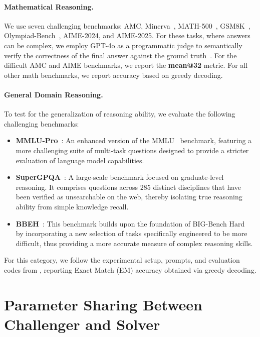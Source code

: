 \paragraph{Mathematical Reasoning.}
We use seven challenging benchmarks: AMC, Minerva~\citep{Lewkowycz2022SolvingQR}, MATH-500~\citep{Hendrycks2021MeasuringMP}, GSM8K~\citep{Cobbe2021TrainingVT}, Olympiad-Bench~\citep{He2024OlympiadBenchAC}, AIME-2024, and AIME-2025. For these tasks, where answers can be complex, we employ GPT-4o as a programmatic judge to semantically verify the correctness of the final answer against the ground truth~\citep{Zhao2025OneTT}. For the difficult AMC and AIME benchmarks, we report the \textbf{mean@32} metric. For all other math benchmarks, we report accuracy based on greedy decoding.

\paragraph{General Domain Reasoning.}
To test for the generalization of reasoning ability, we evaluate the following challenging benchmarks:
\begin{itemize}
    \item \textbf{MMLU-Pro}~\citep{Wang2024MMLUProAM}: An enhanced version of the MMLU~\citep{Hendrycks2020MeasuringMM} benchmark, featuring a more challenging suite of multi-task questions designed to provide a stricter evaluation of language model capabilities.
    \item \textbf{SuperGPQA}~\citep{Team2025SuperGPQASL}: A large-scale benchmark focused on graduate-level reasoning. It comprises questions across 285 distinct disciplines that have been verified as unsearchable on the web, thereby isolating true reasoning ability from simple knowledge recall.
    \item \textbf{BBEH}~\citep{kazemi2025BIGBenchEH}: This benchmark builds upon the foundation of BIG-Bench Hard~\citep{Suzgun2022ChallengingBT} by incorporating a new selection of tasks specifically engineered to be more difficult, thus providing a more accurate measure of complex reasoning skills.
\end{itemize}
For this category, we follow the  experimental setup, prompts, and evaluation codes from \citep{Ma2025GeneralReasonerAL}, reporting Exact Match (EM) accuracy obtained via greedy decoding.


\section{Parameter Sharing Between Challenger and Solver}
\label{app:one_model}

